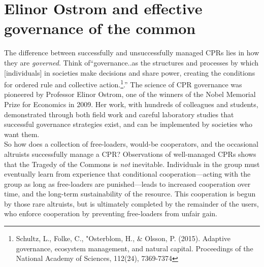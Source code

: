 \section{Elinor Ostrom and effective governance of the common} \label{Elinor Ostrom's insights}
The difference between successfully and unsuccessfully managed CPRs lies in how they are \emph{governed}. Think of``governance..as the structures and processes by which [individuals] in societies make decisions and share power, creating the conditions for ordered rule and collective action.\footnote{Schultz, L., Folke, C., "Osterblom, H., \& Olsson, P. (2015). Adaptive governance, ecosystem management, and natural capital. Proceedings of the National Academy of Sciences, 112(24), 7369-7374}.'' The science of CPR governance was pioneered by Professor Elinor Ostrom, one of the winners of the Nobel Memorial Prize for Economics in 2009. Her work, with hundreds of colleagues and students, demonstrated through both field work and careful laboratory studies that successful governance strategies exist, and can be implemented by societies who want them.\\

So how does a collection of free-loaders, would-be cooperators, and the occasional altruists successfully manage a CPR? Observations of well-managed CPRs shows that the Tragedy of the Commons is \emph{not} inevitable.  Individuals in the group must eventually learn from experience that conditional cooperation---acting with the group as long as free-loaders are punished---leads to increased cooperation over time, and the long-term sustainability of the resource. This cooperation is begun by those rare altruists, but is ultimately completed by the remainder of the users, who enforce cooperation by preventing free-loaders from unfair gain. 

